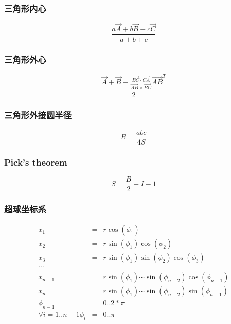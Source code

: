 \subsubsection{三角形内心}
	\[ \frac{a\vec {A} + b\vec{B} + c\vec{C}}{a + b + c} \]
\subsubsection{三角形外心}
	\[ \frac{\vec{A} + \vec{B} - \frac{\overrightarrow {BC} \cdot \overrightarrow{CA}}{\overrightarrow {AB} \times \overrightarrow{BC}}\overrightarrow {AB}^T}{2} \]
\subsubsection{三角形外接圆半径}
	\[ R = \frac{abc}{4S} \]
\subsubsection{Pick's theorem}
	\[ S = \frac{B}{2} + I - 1 \]
\subsubsection{超球坐标系}
\begin{eqnarray*}
 	x_1 &=& r\cos(\phi_1) \\ 
	x_2 &=& r\sin(\phi_1)\cos(\phi_2) \\
	x_3 &=& r\sin(\phi_1)\sin(\phi_2)\cos(\phi_3) \\
	\cdots\\
	x_{n-1} &=& r\sin(\phi_1)\cdots\sin(\phi_{n-2})\cos(\phi_{n-1}) \\
	x_n &=& r\sin(\phi_1)\cdots\sin(\phi_{n-2})\sin(\phi_{n-1}) \\
	\phi_{n-1} &=& 0..2*\pi\\
	\forall {i=1..{n-1}}\phi_i &=& 0..\pi\\
\end{eqnarray*}
